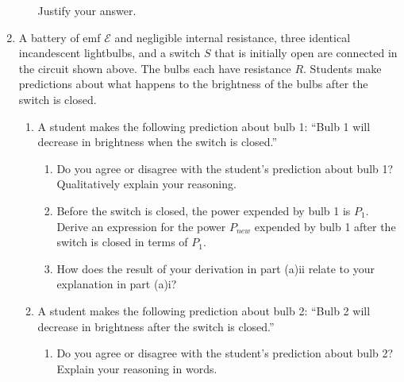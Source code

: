 \documentclass{../../../oss-classkick}
\begin{document}
\begin{enumerate}
\begin{enumerate}
    \vspace{.15in}Justify your answer.
  \end{enumerate}
  \newpage

  \begin{center}
  \end{center}
\item A battery of emf $\mathcal{E}$ and negligible internal resistance, three
  identical incandescent lightbulbs, and a switch $S$ that is initially open
  are connected in the circuit shown above. The bulbs each have resistance $R$.
  Students make predictions about what happens to the brightness of the bulbs
  after the switch is closed.
  \begin{enumerate}
  \item A student makes the following prediction about bulb 1: ``Bulb 1 will
    decrease in brightness when the switch is closed.''
    \begin{enumerate}
    \item Do you agree or disagree with the student's prediction about bulb 1?
      Qualitatively explain your reasoning.
      \vspace{1.25in}

    \item Before the switch is closed, the power expended by bulb 1 is $P_1$.
      Derive an expression for the power $P_{new}$ expended by bulb 1 after the
      switch is closed in terms of $P_1$.
      \vspace{1.5in}
      
    \item How does the result of your derivation in part (a)ii relate to your
      explanation in part (a)i?
      \vspace{1in}
    \end{enumerate}
  \item A student makes the following prediction about bulb 2: ``Bulb 2 will
    decrease in brightness after the switch is closed.''
    \begin{enumerate}
    \item Do you agree or disagree with the student's prediction about bulb 2?
      Explain your reasoning in words.
      \vspace{1.5in}
      

\end{enumerate}
\end{enumerate}
\end{enumerate}
\end{document}
